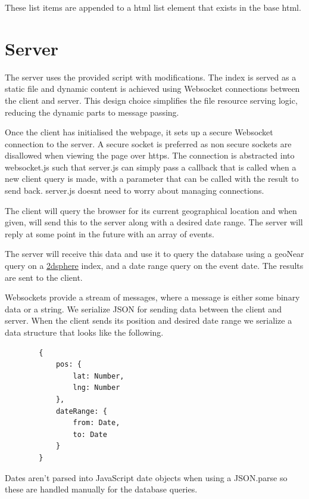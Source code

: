 \documentclass[10pt]{article}
\begin{document}
            These list items are appended to a html list element that exists in the base html.

    \section{Server}
        The server uses the provided script with modifications. The index is served as a static file and dynamic content is achieved using Websocket connections between the client and server. This design choice simplifies the file resource serving logic, reducing the dynamic parts to message passing.

        Once the client has initialised the webpage, it sets up a secure Websocket connection to the server. A secure socket is preferred as non secure sockets are disallowed when viewing the page over https. The connection is abstracted into websocket.js such that server.js can simply pass a callback that is called when a new client query is made, with a parameter that can be called with the result to send back. server.js doesnt need to worry about managing connections.

        The client will query the browser for its current geographical location and when given, will send this to the server along with a desired date range. The server will reply at some point in the future with an array of events.

        The server will receive this data and use it to query the database using a geoNear query on a \href{https://docs.mongodb.com/manual/core/2dsphere/}{2dsphere} index, and a date range query on the event date. The results are sent to the client.

        Websockets provide a stream of messages, where a message is either some binary data or a string. We serialize JSON for sending data between the client and server. When the client sends its position and desired date range we serialize a data structure that looks like the following.

        \begin{verbatim}
        {
            pos: {
                lat: Number,
                lng: Number
            },
            dateRange: {
                from: Date,
                to: Date
            }
        }
        \end{verbatim}

        Dates aren't parsed into JavaScript date objects when using a JSON.parse so these are handled manually for the database queries.
\end{document}
